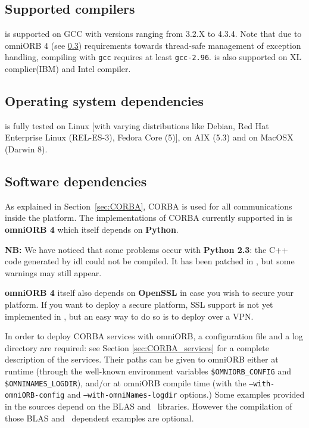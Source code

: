 \subsection{Supported compilers}
\diet is supported on GCC with versions ranging from 3.2.X to 4.3.4.  Note that
due to omniORB 4 (see \ref{sec:software_dependencies}) requirements towards
thread-safe management of exception handling, compiling \diet with \verb+gcc+
requires at least \verb+gcc-2.96+. \diet is also supported on XL complier(IBM)
and Intel compiler.

\subsection{Operating system dependencies}
\diet is fully tested on Linux [with varying distributions like Debian, Red Hat
  Enterprise Linux (REL-ES-3), Fedora Core (5)], on AIX (5.3) and on MacOSX
(Darwin 8).

\subsection{Software dependencies}
\label{sec:software_dependencies}

As explained in Section~\ref{sec:CORBA}, CORBA is used for all communications
inside the platform.  The implementations of CORBA currently supported in \diet
is \textbf{omniORB 4} which itself depends on \textbf{Python}.

\noindent 
\textbf{NB:} We have noticed that some problems occur with \textbf{Python 2.3}:
the C++ code generated by idl could not be compiled. It has been patched in
\diet, but some warnings may still appear.

\textbf{omniORB 4} itself also depends on \textbf{OpenSSL} in case you wish to
secure your \diet platform. If you want to deploy a secure \diet platform, SSL
support is not yet implemented  in \diet, but an easy way to do so is to deploy
\diet over a VPN.

In order to deploy CORBA services with omniORB, a configuration file and a log
directory are required: see Section \ref{sec:CORBA_services} for a complete
description of the services.  Their paths can be given to omniORB either at
runtime (through the well-known environment variables
\texttt{\$OMNIORB\_CONFIG} and \texttt{\$OMNINAMES\_LOGDIR}), and/or at omniORB
compile time (with the \linebreak\texttt{--with-omniORB-config} and
\texttt{--with-omniNames-logdir} options.)  Some examples provided in the \diet
sources depend on the BLAS and \scalapack\ libraries. However the compilation
of those BLAS and \scalapack\ dependent examples are optional.

